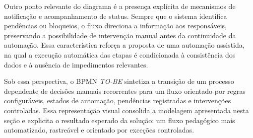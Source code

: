 Outro ponto relevante do diagrama é a presença explícita de mecanismos de
notificação e acompanhamento de status. Sempre que o sistema identifica
pendências ou bloqueios, o fluxo direciona a informação aos responsáveis,
preservando a possibilidade de intervenção manual antes da continuidade
da automação. Essa característica reforça a proposta de uma automação
assistida, na qual a execução automática das etapas é condicionada à
consistência dos dados e à ausência de impedimentos relevantes.

Sob essa perspectiva, o BPMN \textit{TO-BE} sintetiza a transição de um
processo dependente de decisões manuais recorrentes para um fluxo
orientado por regras configuráveis, estados de automação, pendências
registradas e intervenções controladas. Essa representação visual
consolida a modelagem apresentada nesta seção e explicita o resultado
esperado da solução: um fluxo pedagógico mais automatizado, rastreável e
orientado por exceções controladas.

